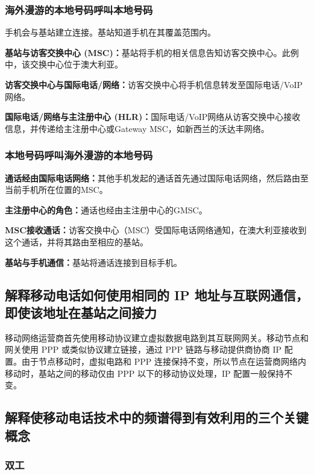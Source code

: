 \subsubsection{海外漫游的本地号码呼叫本地号码}

手机会与基站建立连接。基站知道手机在其覆盖范围内。

\textbf{基站与访客交换中心 (MSC)：}基站将手机的相关信息告知访客交换中心。此例中，该交换中心位于澳大利亚。

\textbf{访客交换中心与国际电话/网络：}访客交换中心将手机信息转发至国际电话/VoIP网络。

\textbf{国际电话/网络与主注册中心 (HLR)：}国际电话/VoIP网络从访客交换中心接收信息，并传递给主注册中心或Gateway MSC，如新西兰的沃达丰网络。

\subsubsection{本地号码呼叫海外漫游的本地号码}

\textbf{通话经由国际电话网络：}其他手机发起的通话首先通过国际电话网络，然后路由至当前手机所在位置的MSC。

\textbf{主注册中心的角色：}通话也经由主注册中心的GMSC。

\textbf{MSC接收通话：}访客交换中心（MSC）受国际电话网络通知，在澳大利亚接收到这个通话，并将其路由至相应的基站。

\textbf{基站与手机通信：}基站将通话连接到目标手机。


\subsection{解释移动电话如何使用相同的 IP 地址与互联网通信，即使该地址在基站之间接力}

移动网络运营商首先使用移动协议建立虚拟数据电路到其互联网网关。移动节点和网关使用 PPP 或类似协议建立链接，通过 PPP 链路与移动提供商协商 IP 配置。由于节点移动时，虚拟电路和 PPP 连接保持不变，所以节点在运营商网络内移动时，基站之间的移动仅由 PPP 以下的移动协议处理，IP 配置一般保持不变。

\subsection{解释使移动电话技术中的频谱得到有效利用的三个关键概念}

\subsubsection{双工}

